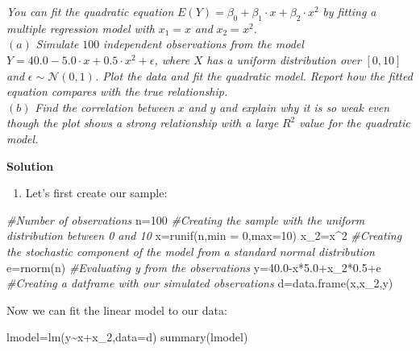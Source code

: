 \documentclass[
]{article}
\newenvironment{Shaded}{\begin{snugshade}}{\end{snugshade}}
\newcommand{\AttributeTok}[1]{\textcolor[rgb]{0.77,0.63,0.00}{#1}}
\newcommand{\CommentTok}[1]{\textcolor[rgb]{0.56,0.35,0.01}{\textit{#1}}}
\newcommand{\DecValTok}[1]{\textcolor[rgb]{0.00,0.00,0.81}{#1}}
\newcommand{\FloatTok}[1]{\textcolor[rgb]{0.00,0.00,0.81}{#1}}
\newcommand{\FunctionTok}[1]{\textcolor[rgb]{0.00,0.00,0.00}{#1}}
\newcommand{\NormalTok}[1]{#1}
\newcommand{\OtherTok}[1]{\textcolor[rgb]{0.56,0.35,0.01}{#1}}
\newcommand{\SpecialCharTok}[1]{\textcolor[rgb]{0.00,0.00,0.00}{#1}}
\providecommand{\tightlist}{%
  \setlength{\itemsep}{0pt}\setlength{\parskip}{0pt}}
\begin{document}
\emph{You can fit the quadratic equation}
\(E(Y) = \beta_0+\beta_1 \cdot x+\beta_2 \cdot x^2\) \emph{by fitting a
multiple regression model with} \(x_1 = x\) \emph{and}
\(x_2 = x^2\)\emph{.}\\
\((a)\) \emph{Simulate} \(100\) \emph{independent observations from the
model} \(Y = 40.0-5.0 \cdot x+0.5\cdot x^2+\epsilon\)\emph{, where}
\(X\) \emph{has a uniform distribution over} \(\left[0, 10\right]\)
\emph{and} \(\epsilon \sim \mathcal{N}(0,1)\)\emph{. Plot the data and
fit the quadratic model. Report how the fitted equation compares with
the true relationship.}\\
\((b)\) \emph{Find the correlation between} \(x\) \emph{and} \(y\)
\emph{and explain why it is so weak even though the plot shows a strong
relationship with a large} \(R^2\) \emph{value for the quadratic model.}

\textbf{Solution}

\begin{enumerate}
\def\labelenumi{\alph{enumi})}
\tightlist
\item
  Let's first create our sample:
\end{enumerate}

\begin{Shaded}
\begin{Highlighting}[]
\CommentTok{\#Number of observations}
\NormalTok{n}\OtherTok{=}\DecValTok{100}
\CommentTok{\#Creating the sample with the uniform distribution between 0 and 10 }
\NormalTok{x}\OtherTok{=}\FunctionTok{runif}\NormalTok{(n,}\AttributeTok{min =} \DecValTok{0}\NormalTok{,}\AttributeTok{max=}\DecValTok{10}\NormalTok{)}
\NormalTok{x\_2}\OtherTok{=}\NormalTok{x}\SpecialCharTok{\^{}}\DecValTok{2}
\CommentTok{\#Creating the stochastic component of the model from a standard normal distribution}
\NormalTok{e}\OtherTok{=}\FunctionTok{rnorm}\NormalTok{(n)}
\CommentTok{\#Evaluating y from the observations }
\NormalTok{y}\OtherTok{=}\FloatTok{40.0}\SpecialCharTok{{-}}\NormalTok{x}\SpecialCharTok{*}\FloatTok{5.0}\SpecialCharTok{+}\NormalTok{x\_2}\SpecialCharTok{*}\FloatTok{0.5}\SpecialCharTok{+}\NormalTok{e}
\CommentTok{\#Creating a datframe with our simulated observations }
\NormalTok{d}\OtherTok{=}\FunctionTok{data.frame}\NormalTok{(x,x\_2,y)}
\end{Highlighting}
\end{Shaded}

Now we can fit the linear model to our data:

\begin{Shaded}
\begin{Highlighting}[]
\NormalTok{lmodel}\OtherTok{=}\FunctionTok{lm}\NormalTok{(y}\SpecialCharTok{\textasciitilde{}}\NormalTok{x}\SpecialCharTok{+}\NormalTok{x\_2,}\AttributeTok{data=}\NormalTok{d)}
\FunctionTok{summary}\NormalTok{(lmodel)}
\end{Highlighting}
\end{Shaded}
\end{document}
